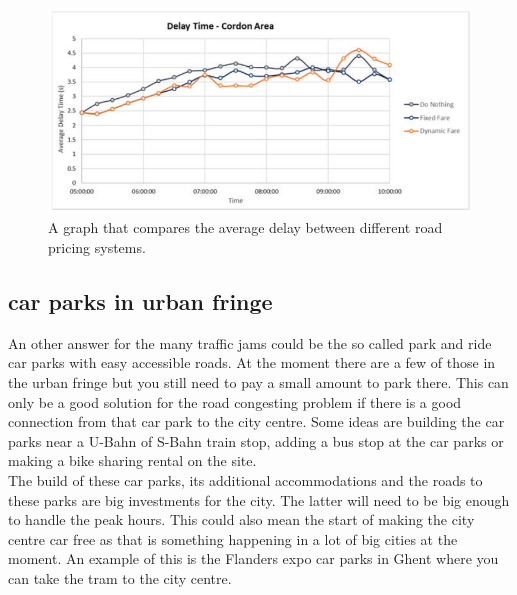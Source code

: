 \begin{figure}[h!]
	\centering
	\includegraphics[width=0.55\textheight]{ProblemsFigures/dynamicRoadPricing}
	\caption{A graph that compares the average delay between different road pricing systems. }
	\label{fig:dynroad}
\end{figure}

\subsection{car parks in urban fringe} \label{subsec:parkin}
An other answer for the many traffic jams could be the so called park and ride car parks with easy accessible roads. At the moment there are a few of those in the urban fringe but you still need to pay a small amount to park there. This can only be a good solution for the road congesting problem if there is a good connection from that car park to the city centre. Some ideas are building the car parks near a U-Bahn of S-Bahn train stop, adding a bus stop at the car parks or making a bike sharing rental on the site. \\ \newline 
The build of these car parks, its additional accommodations and the roads to these parks are big investments for the city. The latter will need to be big enough to handle the peak hours. This could also mean the start of making the city centre car free as that is something happening in a lot of big cities at the moment. An example of this is the Flanders expo car parks in Ghent where you can take the tram to the city centre. 

